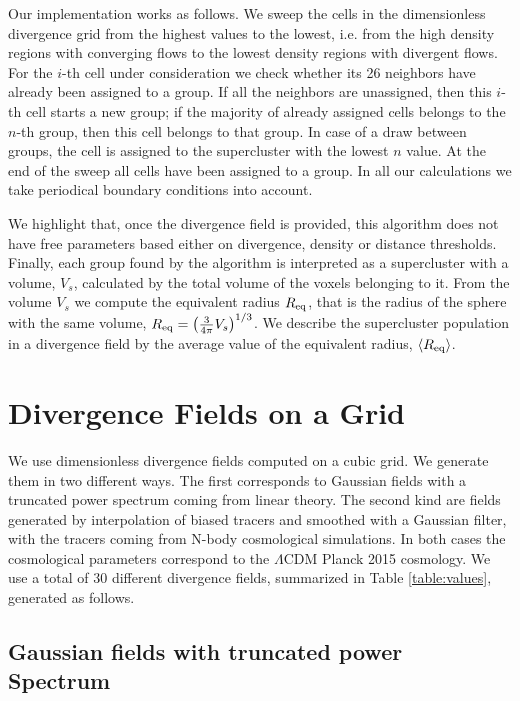 \documentclass[usenatbib]{mnras}
\begin{document}
Our implementation works as follows. 
We sweep the cells in the dimensionless divergence grid from the highest values to the lowest, i.e. from the high density regions with converging flows to the lowest density regions with divergent flows.
For the $i$-th cell under consideration we check whether its 26 neighbors have already been assigned to a group. 
If all the neighbors are unassigned, then this $i$-th cell starts a new group; if the majority of already assigned cells belongs to the $n$-th group, then this cell belongs to that group.
In case of a draw between groups, the cell is assigned to the supercluster with the lowest $n$ value.
At the end of the sweep all cells have been assigned to a group. 
In all our calculations we take periodical boundary conditions into account.  

We highlight that, once the divergence field is provided, this algorithm
does not have free parameters based either on divergence, density or distance thresholds. 
Finally, each group found by the algorithm is interpreted as a supercluster 
with a volume, $V_s$, calculated by the total volume of the voxels belonging to it.
From the volume $V_s$ we compute the equivalent radius $R_{\rm eq}$, that is the radius of the sphere with the same volume, 
   $ R_{\rm eq} = \left(\frac{3}{4\pi}V_{s}\right)^{1/3}$.
We describe the supercluster population in a divergence field by the average value of the equivalent radius, $\langle R_{\rm eq}\rangle$.




\section{Divergence Fields on a Grid}
\label{sec:fields}

We use dimensionless divergence fields computed on a cubic grid. 
We generate them in two different ways.
The first corresponds to Gaussian fields with a truncated power spectrum coming from linear theory.
The second kind are fields generated by interpolation of biased tracers and smoothed with a Gaussian filter, with the tracers coming from N-body cosmological simulations.
In both cases the cosmological parameters correspond to the
$\Lambda$CDM Planck 2015 cosmology. 
We use a total of $30$ different divergence fields, summarized in Table \ref{table:values}, generated as follows.

\subsection{Gaussian fields with truncated power Spectrum}
\end{document}
